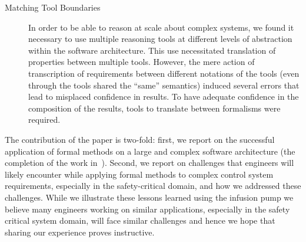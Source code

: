 \begin{description}
    \item[Matching Tool Boundaries] In order to be able to reason at scale about complex systems, we found it necessary to use multiple reasoning tools at different levels of abstraction within the software architecture. This use necessitated translation of properties between multiple tools. However, the mere action of transcription of requirements between different notations of the tools (even through the tools shared the “same” semantics) induced several errors that lead to misplaced confidence in results. To have adequate confidence in the composition of the results, tools to translate between formalisms were required. %
        
\end{description}

The contribution of the paper is two-fold: first, we report on the successful application of formal methods on a large and complex software architecture (the completion of the work in~\cite{hilt2013}). Second, we report on challenges that engineers will likely encounter while applying formal methods to complex control system requirements, especially in the safety-critical domain, and how we addressed these challenges. %
While we illustrate these lessons learned using the infusion pump we believe many engineers working on similar applications, especially in the safety critical system domain, will face similar challenges and hence we hope that sharing our experience proves instructive. %

